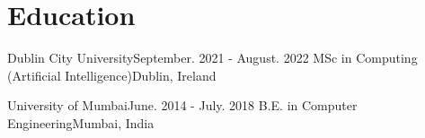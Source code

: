 \section{Education}
  \resumeSubHeadingListStart
    \resumeSubheading
      {Dublin City University}{September. 2021 - August. 2022}
      {MSc in Computing (Artificial Intelligence)}{Dublin, Ireland}
      
    \resumeSubheading
      {University of Mumbai}{June. 2014 - July. 2018}
      {B.E. in Computer Engineering}{Mumbai, India}
  \resumeSubHeadingListEnd
